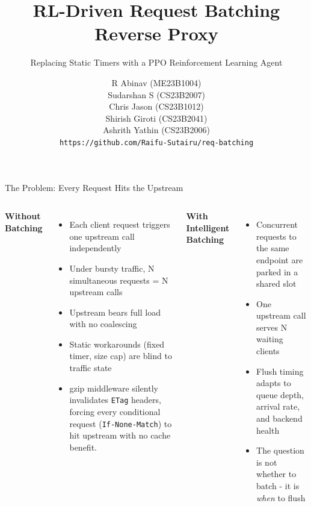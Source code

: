 \documentclass[aspectratio=169]{beamer}
\title{RL-Driven Request Batching Reverse Proxy}
\subtitle{Replacing Static Timers with a PPO Reinforcement Learning Agent}
\institute{Course: Reinforcement Learning (CS3009)}
\author{
  R Abinav (ME23B1004) \\
  Sudarshan S (CS23B2007) \\
  Chris Jason (CS23B1012) \\
  Shirish Giroti (CS23B2041) \\
  Ashrith Yathin (CS23B2006) \\
  \vspace{0.5em}
  \texttt{\small https://github.com/Raifu-Sutairu/req-batching}
}
\date{}
\begin{document}
\begin{frame}
  \maketitle
\end{frame}

\begin{frame}{The Problem: Every Request Hits the Upstream}
\small
\begin{columns}[T]
\begin{minipage}[t]{0.47\textwidth}
\textbf{Without Batching}
\begin{itemize}
  \small
  \item Each client request triggers one upstream call independently
  \item Under bursty traffic, N simultaneous requests = N upstream calls
  \item Upstream bears full load with no coalescing
  \item Static workarounds (fixed timer, size cap) are blind to traffic state
  \item gzip middleware silently invalidates \texttt{ETag} headers, forcing every conditional request (\texttt{If-None-Match}) to hit upstream with no cache benefit.
\end{itemize}
\end{minipage}
\hfill
\begin{minipage}[t]{0.47\textwidth}
\textbf{With Intelligent Batching}
\begin{itemize}
  \small
  \item Concurrent requests to the same endpoint are parked in a shared slot
  \item One upstream call serves N waiting clients
  \item Flush timing adapts to queue depth, arrival rate, and backend health
  \item The question is not whether to batch - it is \textit{when} to flush
\end{itemize}
\end{minipage}
\end{columns}
\end{frame}
\end{document}
